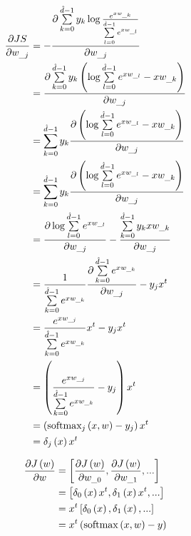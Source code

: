 \documentclass[runningheads,openany]{xhlPaper}
\begin{document}
\begin{equation}
\label{equ:softmaxDerivationOnW_p}
\begin{aligned}
\frac{{\partial JS}}{{\partial {w_{\_j}}}} &=  - \frac{{\partial \sum\limits_{k = 0}^{\hat d - 1} {{y_k}\log \frac{{{e^{x{w_{\_k}}}}}}{{\sum\limits_{l = 0}^{\hat d - 1} {{e^{x{w_{\_l}}}}} }}} }}{{\partial {w_{\_j}}}}\\
 &= \frac{{\partial \sum\limits_{k = 0}^{\hat d - 1} {{y_k}\left( {\log \sum\limits_{l = 0}^{\hat d - 1} {{e^{x{w_{\_l}}}}}  - x{w_{\_k}}} \right)} }}{{\partial {w_{\_j}}}}\\
 &= \sum\limits_{k = 0}^{\hat d - 1} {{y_k}} \frac{{\partial \left( {\log \sum\limits_{l = 0}^{\hat d - 1} {{e^{x{w_{\_l}}}}}  - x{w_{\_k}}} \right)}}{{\partial {w_{\_j}}}}\\
 &= \sum\limits_{k = 0}^{\hat d - 1} {{y_k}} \frac{{\partial \left( {\log \sum\limits_{l = 0}^{\hat d - 1} {{e^{x{w_{\_l}}}}}  - x{w_{\_k}}} \right)}}{{\partial {w_{\_j}}}}\\
 &= \frac{{\partial \log \sum\limits_{l = 0}^{\hat d - 1} {{e^{x{w_{\_l}}}}} }}{{\partial {w_{\_j}}}} - \frac{{\sum\limits_{k = 0}^{\hat d - 1} {{y_k}x{w_{\_k}}} }}{{\partial {w_{\_j}}}}\\
 &= \frac{1}{{\sum\limits_{k = 0}^{\hat d - 1} {{e^{x{w_{\_k}}}}} }}\frac{{\partial \sum\limits_{k = 0}^{\hat d - 1} {{e^{x{w_{\_k}}}}} }}{{\partial {w_{\_j}}}} - {y_j}{x^t}\\
 &= \frac{{{e^{x{w_{\_j}}}}}}{{\sum\limits_{k = 0}^{\hat d - 1} {{e^{x{w_{\_k}}}}} }}{x^t} - {y_j}{x^t}\\
 &= \left( {\frac{{{e^{x{w_{\_j}}}}}}{{\sum\limits_{k = 0}^{\hat d - 1} {{e^{x{w_{\_k}}}}} }} - {y_j}} \right){x^t}\\
 &= \left( {{\rm{softma}}{{\rm{x}}_j}\left( {x,w} \right) - {y_j}} \right){x^t}\\
 &= {\delta _j}\left( x \right){x^t}
\end{aligned}
\end{equation}

\begin{equation}
\label{equ:softmaxDerivationOnW}
\begin{aligned}
\frac{{\partial J\left( w \right)}}{{\partial w}} &= \left[ {\frac{{\partial J\left( w \right)}}{{\partial {w_{\_0}}}},\frac{{\partial J\left( w \right)}}{{\partial {w_{\_1}}}},...} \right]\\
 &= \left[ {{\delta _0}\left( x \right){x^t},{\delta _1}\left( x \right){x^t},...} \right]\\
 &= {x^t}\left[ {{\delta _0}\left( x \right),{\delta _1}\left( x \right),...} \right]\\
 &= {x^t}\left( {{\rm{softmax}}\left( {x,w} \right) - y} \right)
\end{aligned}
\end{equation}
\end{document}
